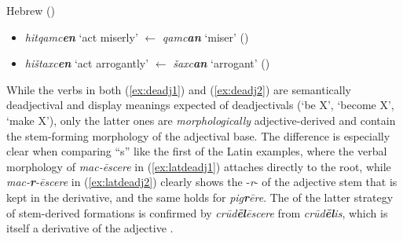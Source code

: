 \documentclass[output=paper,colorlinks,citecolor=brown]{langscibook}
\begin{document}
\begin{exe}
\begin{xlist}
\begin{xlist}
\begin{itemize}
        \end{itemize}
        \ex Hebrew (\citealt[752, fn.\ 11]{Arad2003}) \label{ex:hebrewdeadj2}
        \begin{itemize}
            \item           \textit{hitqamc\textbf{en}} `act miserly' $\leftarrow$ \textit{qamc\textbf{an}} `miser' ()
            \item        \textit{hištaxc\textbf{en}} `act arrogantly' $\leftarrow$ \textit{šaxc\textbf{an}} `arrogant' ()
        \end{itemize}
        \end{xlist}
    \end{xlist}
\end{exe}

While the verbs in both (\ref{ex:deadj1}) and (\ref{ex:deadj2}) are semantically deadjectival  and display meanings expected of deadjectivals (`be X', `become X', `make X'), only the latter ones are \emph{morphologically} adjective-derived and contain the stem-forming morphology of the adjectival base. The difference is especially clear when comparing ``s'' like the first of the Latin examples, where the verbal morphology of \textit{mac-ēscere}  in (\ref{ex:latdeadj1}) attaches directly to the root, while \textit{mac-\textbf{r}-ēscere}   in (\ref{ex:latdeadj2}) clearly shows the -\textit{r}- of the adjective stem that is kept in the derivative, and the same holds  for \textit{pig\textbf{r}ēre}.  The  of the latter strategy of stem-derived formations is confirmed by \textit{crūd\textbf{ēl}ēscere}  from \textit{crūd\textbf{ēl}is},  which is itself a derivative of the adjective .
\end{document}
